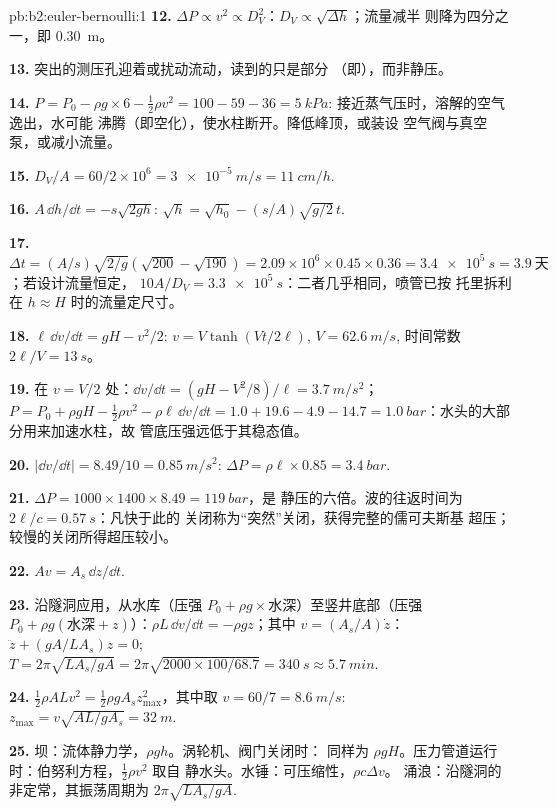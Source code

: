\begin{solution}{pb:b2:euler-bernoulli:1}
\textbf{12.} $\Delta P \propto v^2 \propto D_V^2$：$D_V \propto \sqrt{\Delta h}$；流量减半
则降为四分之一，即 \qty{0.30}{m}。

\textbf{13.} 突出的测压孔迎着或扰动流动，读到的只是部分
（即），而非静压。

\textbf{14.} $P = P_0 - \rho g \times 6 - \tfrac12\rho v^2 = 100 - 59 - 36 = \qty{5}{kPa}$:
接近蒸气压时，溶解的空气逸出，水可能
沸腾（即空化），使水柱断开。降低峰顶，或装设
空气阀与真空泵，或减小流量。

\textbf{15.} $D_V/A = 60/2 \times 10^6 = \qty{3e-5}{m/s} = \qty{11}{cm/h}$.

\textbf{16.} $A\,\dd h/\dd t = -s\sqrt{2gh}$: $\sqrt h = \sqrt{h_0} - (s/A)\sqrt{g/2}\,t$.

\textbf{17.} $\Delta t = (A/s)\sqrt{2/g}(\sqrt{200} - \sqrt{190}) = 2.09 \times 10^6 \times
0.45 \times 0.36 = \qty{3.4e5}{s} = \qty{3.9}{\text{天}}$；若设计流量恒定，
$10A/D_V = \qty{3.3e5}{s}$：二者几乎相同，喷管已按
托里拆利在 $h \approx H$ 时的流量定尺寸。

\textbf{18.} $\ell\,\dd v/\dd t = gH - v^2/2$: $v = V\tanh(Vt/2\ell)$, $V = \qty{62.6}{m/s}$,
时间常数 $2\ell/V = \qty{13}{s}$。

\textbf{19.} 在 $v = V/2$ 处：$\dd v/\dd t = (gH - V^2/8)/\ell = \qty{3.7}{m/s^2}$；
$P = P_0 + \rho gH - \tfrac12\rho v^2 - \rho\ell\,\dd v/\dd t = 1.0 + 19.6 - 4.9 - 14.7
= \qty{1.0}{bar}$：水头的大部分用来加速水柱，故
管底压强远低于其稳态值。

\textbf{20.} $|\dd v/\dd t| = 8.49/10 = \qty{0.85}{m/s^2}$: $\Delta P = \rho\ell \times 0.85 =
\qty{3.4}{bar}$.

\textbf{21.} $\Delta P = 1000 \times 1400 \times 8.49 = \qty{119}{bar}$，是
静压的六倍。波的往返时间为 $2\ell/c = \qty{0.57}{s}$：凡快于此的
关闭称为“突然”关闭，获得完整的儒可夫斯基
超压；较慢的关闭所得超压较小。

\textbf{22.} $Av = A_s\,\dd z/\dd t$.

\textbf{23.} 沿隧洞应用，从水库（压强
$P_0 + \rho g\times$水深）至竖井底部（压强 $P_0 + \rho g
(\text{水深} + z)$）：$\rho L\,\dd v/\dd t = -\rho gz$；其中 $v = (A_s/A)\dot z$：
$\ddot z + (gA/LA_s)z = 0$; $T = 2\pi\sqrt{LA_s/gA} = 2\pi\sqrt{2000 \times 100/
68.7} = \qty{340}{s} \approx \qty{5.7}{min}$.

\textbf{24.} $\tfrac12\rho ALv^2 = \tfrac12\rho gA_sz_{\max}^2$，其中取 $v = 60/7 =
\qty{8.6}{m/s}$: $z_{\max} = v\sqrt{AL/gA_s} = \qty{32}{m}$.

\textbf{25.} 坝：流体静力学，$\rho gh$。涡轮机、阀门关闭时：
同样为 $\rho gH$。压力管道运行时：伯努利方程，$\tfrac12\rho v^2$ 取自
静水头。水锤：可压缩性，$\rho c\Delta v$。
涌浪：沿隧洞的非定常，其振荡周期为
$2\pi\sqrt{LA_s/gA}$.
\end{solution}
